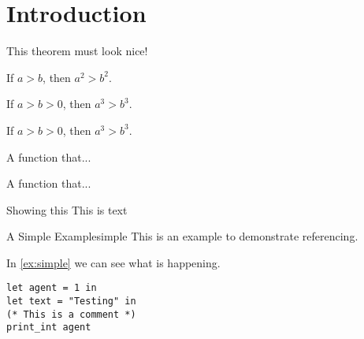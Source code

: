 \newpage
\chapter{Introduction}
\label{Introduction}

\begin{theorem}
	This theorem must look nice!
\end{theorem}
\begin{theorem}
If \(a > b\), then \(a^2 > b^2\).
\end{theorem}

\begin{corollary}
If \(a > b > 0\), then \(a^3 > b^3\).
\end{corollary}

\begin{proposition}
If \(a > b > 0\), then \(a^3 > b^3\).
\end{proposition}

\begin{definition}
A function that...
\label{def:Continuous}
\end{definition}

\begin{definition}
A function that...
\label{def:Discrete}
\end{definition}


\begin{example}{Showing this}{}
	This is text
\end{example}


\begin{example}{A Simple Example}{simple}
This is an example to demonstrate referencing.
	\hfill
\end{example}

In \cref{ex:simple} we can see what is happening. 

\begin{lstlisting}[language=caml]
let agent = 1 in
let text = "Testing" in
(* This is a comment *)
print_int agent
\end{lstlisting}

